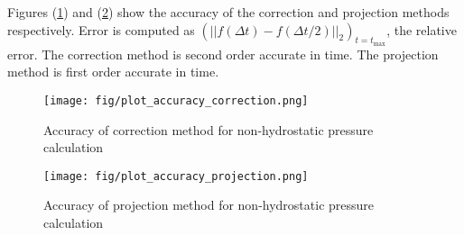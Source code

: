 \documentclass[12pt]{article}
\begin{document}
Figures (\ref{fig:plot_accuracy_correction}) and (\ref{fig:plot_accuracy_projection}) show the accuracy of the correction and projection methods respectively. Error is computed as $(||f(\Delta t) - f(\Delta t / 2)||_2 )_{t=t_{\text{max}}}$, the relative error. The correction method is second order accurate in time. The projection method is first order accurate in time.

	\begin{figure}[htb]
		\begin{center}
			\texttt{[image: fig/plot\_accuracy\_correction.png]}
			\caption{Accuracy of correction method for non-hydrostatic pressure calculation}
			\label{fig:plot_accuracy_correction}
		\end{center}
	\end{figure}
	
	\begin{figure}[htb]
		\begin{center}
			\texttt{[image: fig/plot\_accuracy\_projection.png]}
			\caption{Accuracy of projection method for non-hydrostatic pressure calculation}
			\label{fig:plot_accuracy_projection}
		\end{center}
	\end{figure}
\end{document}
